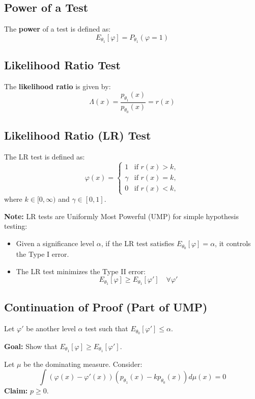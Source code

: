 \documentclass[open=any, 11pt,paper=A4]{scrreprt}
\begin{document}
\subsection*{Power of a Test}
The \textbf{power} of a test is defined as:
\[
E_{\theta_1}[\varphi] = P_{\theta_1}(\varphi = 1)
\]

\subsection*{Likelihood Ratio Test}
The \textbf{likelihood ratio} is given by:
\[
\Lambda(x) = \frac{p_{\theta_1}(x)}{p_{\theta_0}(x)} = r(x)
\]

\subsection*{Likelihood Ratio (LR) Test}
The LR test is defined as:
\[
\varphi(x) = 
\begin{cases} 
1 & \text{if } r(x) > k, \\
\gamma & \text{if } r(x) = k, \\
0 & \text{if } r(x) < k,
\end{cases}
\]
where \( k \in [0, \infty) \) and \( \gamma \in [0, 1] \).

\textbf{Note:} LR tests are Uniformly Most Powerful (UMP) for simple hypothesis testing:
\begin{itemize}
    \item Given a significance level \( \alpha \), if the LR test satisfies \( E_{\theta_0}[\varphi] = \alpha \), it controls the Type I error.
    \item The LR test minimizes the Type II error:
    \[
    E_{\theta_1}[\varphi] \geq E_{\theta_1}[\varphi'] \quad \forall \varphi'
    \]
\end{itemize}

\subsection*{Continuation of Proof (Part of UMP)}
Let \( \varphi' \) be another level \( \alpha \) test such that \( E_{\theta_0}[\varphi'] \leq \alpha \).

\textbf{Goal:} Show that \( E_{\theta_1}[\varphi] \geq E_{\theta_1}[\varphi'] \).

Let \( \mu \) be the dominating measure. Consider:
\[
\int (\varphi(x) - \varphi'(x)) \left( p_{\theta_1}(x) - k p_{\theta_0}(x) \right) d\mu(x) = 0
\]
\textbf{Claim:} \( p \geq 0 \).
\end{document}
